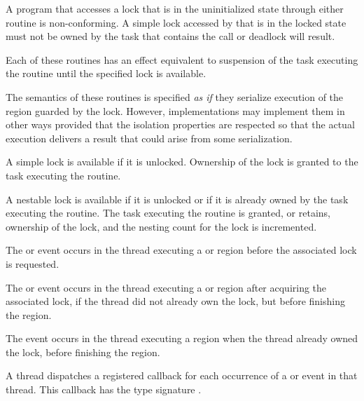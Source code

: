 \constraints
A program that accesses a lock that is in the uninitialized state through either routine is
non-conforming. A simple lock accessed by  that is in the locked state
must not be owned by the task that contains the call or deadlock will result.

\effect
Each of these routines has an effect equivalent to suspension of the task
executing the routine until the specified lock is available.


\begin{note} The semantics of these routines is specified
\emph{as if} they serialize execution of the region guarded by the
lock. However, implementations may implement them in other ways
provided that the isolation properties are respected so that the
actual execution delivers a result that could arise from some
serialization.
\end{note}

A simple lock is available if it is unlocked. Ownership of the lock is
granted to the task executing the routine.

A nestable lock is available if it is unlocked or if it is already owned by
the task executing the routine. The task executing the routine is granted,
or retains, ownership of the lock, and the nesting count for the lock is
incremented.

\events

The  or  event occurs in the thread
executing a  or  region
before the associated lock is requested.

The  or  event occurs in the thread
executing a  or  region
after acquiring the associated lock, if the thread did not already own the lock,
but before finishing the region.

The  event occurs in the thread
executing a  region
when the thread already owned the lock,
before finishing the region.


\tools

A thread dispatches a registered 
callback for each occurrence of a  or  event
in that thread.  This callback has the type signature .

